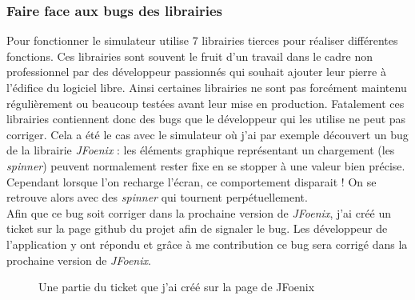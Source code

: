 \subsubsection{Faire face aux bugs des librairies}
Pour fonctionner le simulateur utilise 7 librairies tierces pour réaliser différentes fonctions. Ces librairies sont souvent le fruit d'un travail dans le cadre non professionnel par des développeur passionnés qui souhait ajouter leur pierre à l'édifice du logiciel libre. Ainsi certaines librairies ne sont pas forcément maintenu régulièrement ou beaucoup testées avant leur mise en production. Fatalement ces librairies contiennent donc des bugs que le développeur qui les utilise ne peut pas corriger. Cela a été le cas avec le simulateur où j'ai par exemple découvert un bug de la librairie \emph{JFoenix} : les éléments graphique représentant un chargement (les \emph{spinner}) peuvent normalement rester fixe en se stopper à une valeur bien précise. Cependant lorsque l'on recharge l'écran, ce comportement disparait ! On se retrouve alors avec des \emph{spinner} qui tournent perpétuellement.\\

Afin que ce bug soit corriger dans la prochaine version de \emph{JFoenix}, j'ai créé un \gls{ticket} sur la page \gls{github} du projet afin de signaler le bug. Les développeur de l'application y ont répondu et grâce à me contribution ce bug sera corrigé dans la prochaine version de \emph{JFoenix}.

\begin{figure}[h]
	\begin{center}
		\caption{Une partie du ticket que j'ai créé sur la page de JFoenix}
	\end{center}
\end{figure}

